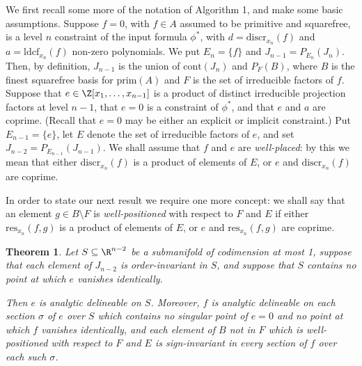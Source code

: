 \documentclass{article}
\newtheorem{theorem}{Theorem}
\begin{document}
We first recall some more of the notation of Algorithm 1, and make some
basic assumptions.
Suppose $f = 0$, with $f \in A$ assumed to be primitive and squarefree, 
is a level $n$ constraint of
the input formula $\phi^*$, with $d = \mathrm{discr}_{x_n}(f)$ 
and $a = \mathrm{ldcf}_{x_n}(f)$ non-zero polynomials.
We put $E_n = \{f\}$ and $J_{n-1} =P_{E_n}(J_n)$.
Then, by definition, $J_{n-1}$ is the union of $\mathrm{cont}(J_n)$
and $P_{F}(B)$, where $B$ is the finest squarefree basis for
$\mathrm{prim}(A)$ and $F$ is the set of irreducible factors of $f$.
Suppose that $e \in \Z[x_1, \ldots, x_{n-1}]$ is a product
of distinct irreducible projection factors at level $n-1$,
that $e = 0$ is a constraint of $\phi^*$,
and that $e$ and $a$ are coprime.
(Recall that $e=0$ may be either an explicit or implicit constraint.)
Put $E_{n-1} = \{e\}$, let $E$ denote the set of irreducible
factors of $e$, and set $J_{n-2} = P_{E_{n-1}}(J_{n-1})$.
We shall assume that $f$ and $e$ are {\em well-placed}: by this we mean
that either $\mathrm{discr}_{x_n}(f)$ is a product of elements of $E$,
or $e$ and $\mathrm{discr}_{x_n}(f)$ are coprime.

In order to state our next result we require one more concept:
we shall say that an element $g \in B \setminus F$ is
{\em well-positioned} with respect to $F$ and $E$ 
if either $\mathrm{res}_{x_n}(f,g)$ is a product of elements 
of $E$, or $e$ and $\mathrm{res}_{x_n}(f,g)$ are coprime.

\begin{theorem}
    Let $S \subseteq \R^{n-2}$ be a submanifold of codimension at most 1,
    suppose that each element of $J_{n-2}$ is order-invariant
    in $S$, and suppose that $S$ contains no point at which $e$
    vanishes identically. 
    
    Then $e$ is analytic delineable on $S$. 
    Moreover, $f$ is analytic delineable 
    on each section $\sigma$ of $e$ over $S$
    which contains no singular point of $e = 0$
    and no point at which $f$ vanishes identically,
    and each element of $B$ not in $F$ which is well-positioned with
    respect to $F$ and $E$
    is sign-invariant in every section of $f$ over each such $\sigma$.
\end{theorem}
\end{document}
